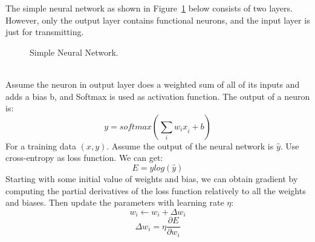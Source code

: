 \documentclass[]{UCD_CS_FYP_Report}
\begin{document}
The simple neural network as shown in Figure~\ref{fig:Feedforward_Neural_Network} below consists of two layers. However, only the output layer contains functional neurons, and the input layer is just for transmitting.
\begin{figure}[h]
\centering
\fboxsep 2mm
\caption{\label{fig:Feedforward_Neural_Network} Simple Neural Network.}
\end{figure}
\\Assume the neuron in output layer does a weighted sum of all of its inputs and adds a bias b, and Softmax is used as activation function. The output of a neuron is:
\begin{equation}
y=softmax\left(\sum_i{w_ix}_i+b\right)
\end{equation}
For a training data $(x,y)$. Assume the output of the neural network is $\hat{y}$. Use cross-entropy as loss function. We can get:
\begin{equation}
E=ylog\left(\hat{y}\right)
\end{equation}
Starting with some initial value of weights and bias, we can obtain gradient by computing the partial derivatives of the loss function relatively to all the weights and biases. Then update the parameters with learning rate $\eta{}$:
\begin{equation}
w_i\leftarrow{}w_i+\Delta{}w_i
\end{equation}
\begin{equation}
\Delta{}w_i=\eta{}\frac{\partial{}E}{\partial{}w_i}
\end{equation}
\end{document}
